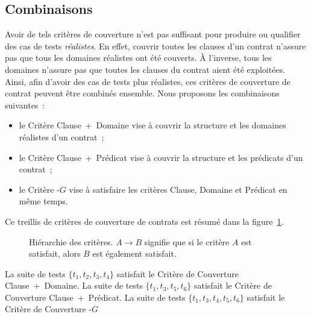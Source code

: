 \subsection{Combinaisons}
\label{subsection:test:combination}

Avoir de tels critères de couverture n'est pas suffisant pour produire ou
qualifier des cas de tests {\em réalistes}. En effet, couvrir toutes les clauses
d'un contrat n'assure pas que tous les domaines réalistes ont été couverts. À
l'inverse, tous les domaines n'assure pas que toutes les clauses du contrat
aient été exploitées. Ainsi, afin d'avoir des cas de tests plus réalistes, ces
critères de couverture de contrat peuvent être combinés ensemble. Nous proposons
les combinaisons suivantes~:
%
\begin{itemize}

\item le Critère Clause~+~Domaine vise à couvrir la structure et les domaines
réalistes d'un contrat~;

\item le Critère Clause~+~Prédicat vise à couvrir la structure et les prédicats
d'un contrat~;

\item le Critère -$G$ vise à satisfaire les critères Clause,
Domaine et Prédicat en même temps.

\end{itemize}
%
Ce {\strong treillis} de critères de couverture de contrats est résumé dans la
figure~\ref{figure:test:lattice}.

\begin{figure}


\caption[Hiérarchie des critères.]{\label{figure:test:lattice} Hiérarchie des
critères. $A \rightarrow B$ signifie que si le critère $A$ est satisfait, alors
$B$ est également satisfait.}

\end{figure}

\begin{example}

La suite de tests $\{t_1, t_2, t_3, t_4\}$ satisfait le Critère de Couverture
Clause~+~Domaine. La suite de tests $\{t_1, t_3, t_5, t_6\}$ satisfait le
Critère de Couverture Clause~+~Prédicat. La suite de tests $\{t_1, t_3, t_4,
t_5, t_6\}$ satisfait le Critère de Couverture -$G$

\end{example}
